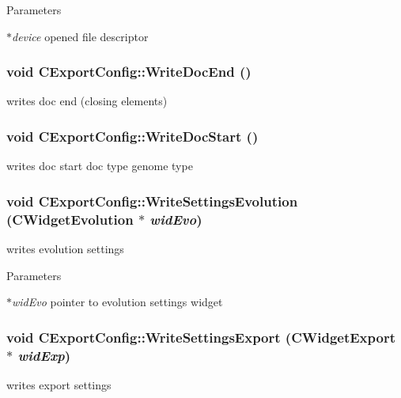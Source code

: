 \begin{DoxyParams}{Parameters}
\item[{\em $\ast$device}]opened file descriptor \end{DoxyParams}
\hypertarget{classCExportConfig_af055c2f9bb0af94ef17b490bde396b57}{
\subsubsection[{WriteDocEnd}]{\setlength{\rightskip}{0pt plus 5cm}void CExportConfig::WriteDocEnd ()}}
\label{classCExportConfig_af055c2f9bb0af94ef17b490bde396b57}
writes doc end (closing elements) \hypertarget{classCExportConfig_a44d785a78a90004ce37fc78788ff22cf}{
\subsubsection[{WriteDocStart}]{\setlength{\rightskip}{0pt plus 5cm}void CExportConfig::WriteDocStart ()}}
\label{classCExportConfig_a44d785a78a90004ce37fc78788ff22cf}
writes doc start doc type genome type \hypertarget{classCExportConfig_aa345f949a1d6fba9c20704f5d977eccc}{
\subsubsection[{WriteSettingsEvolution}]{\setlength{\rightskip}{0pt plus 5cm}void CExportConfig::WriteSettingsEvolution ({\bf CWidgetEvolution} $\ast$ {\em widEvo})}}
\label{classCExportConfig_aa345f949a1d6fba9c20704f5d977eccc}
writes evolution settings


\begin{DoxyParams}{Parameters}
\item[{\em $\ast$widEvo}]pointer to evolution settings widget \end{DoxyParams}
\hypertarget{classCExportConfig_af54bae02599cec0d5fc28ab0f0f2f46d}{
\subsubsection[{WriteSettingsExport}]{\setlength{\rightskip}{0pt plus 5cm}void CExportConfig::WriteSettingsExport ({\bf CWidgetExport} $\ast$ {\em widExp})}}
\label{classCExportConfig_af54bae02599cec0d5fc28ab0f0f2f46d}
writes export settings


